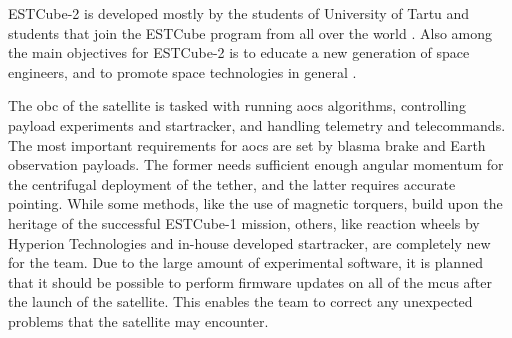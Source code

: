 ESTCube-2 is developed mostly by the students of University of Tartu and students that join the ESTCube program from all over the world \cite{Ehrpais2016}. Also among the main objectives for ESTCube-2 is to educate a new generation of space engineers, and to promote space technologies in general \cite{Iakubivskyi2016}.

The \gls{obc} of the satellite is tasked with running \gls{aocs} algorithms, controlling payload experiments and startracker, and handling telemetry and telecommands. The most important requirements for \gls{aocs} are set by blasma brake and Earth observation payloads. The former needs sufficient enough angular momentum for the centrifugal deployment of the tether, and the latter requires accurate pointing. While some methods, like the use of magnetic torquers, build upon the heritage of the successful ESTCube-1 mission, others, like reaction wheels by Hyperion Technologies and in-house developed startracker, are completely new for the team. Due to the large amount of experimental software, it is planned that it should be possible to perform firmware updates on all of the \glspl{mcu} after the launch of the satellite. This enables the team to correct any unexpected problems that the satellite may encounter. \cite{Ehrpais2016}
